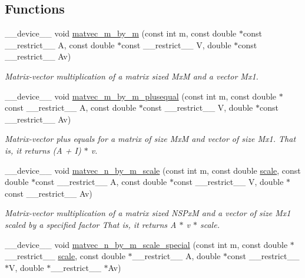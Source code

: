 \subsection*{Functions}
\begin{DoxyCompactItemize}
\item 
\+\_\+\+\_\+device\+\_\+\+\_\+ void \hyperlink{exponential__linear__algebra_8cu_a2e59348b99908b5918de88097e15d5ff}{matvec\+\_\+m\+\_\+by\+\_\+m} (const int m, const double $\ast$const \+\_\+\+\_\+restrict\+\_\+\+\_\+ A, const double $\ast$const \+\_\+\+\_\+restrict\+\_\+\+\_\+ V, double $\ast$const \+\_\+\+\_\+restrict\+\_\+\+\_\+ Av)
\begin{DoxyCompactList}\small\item\em Matrix-\/vector multiplication of a matrix sized MxM and a vector Mx1. \end{DoxyCompactList}\item 
\+\_\+\+\_\+device\+\_\+\+\_\+ void \hyperlink{exponential__linear__algebra_8cu_a6bc7e5c08b8e40b19ce05ea146c05307}{matvec\+\_\+m\+\_\+by\+\_\+m\+\_\+plusequal} (const int m, const double $\ast$const \+\_\+\+\_\+restrict\+\_\+\+\_\+ A, const double $\ast$const \+\_\+\+\_\+restrict\+\_\+\+\_\+ V, double $\ast$const \+\_\+\+\_\+restrict\+\_\+\+\_\+ Av)
\begin{DoxyCompactList}\small\item\em Matrix-\/vector plus equals for a matrix of size MxM and vector of size Mx1. That is, it returns (A + I) $\ast$ v. \end{DoxyCompactList}\item 
\+\_\+\+\_\+device\+\_\+\+\_\+ void \hyperlink{exponential__linear__algebra_8cu_a03e37312683db492dc73e08c17fe40e7}{matvec\+\_\+n\+\_\+by\+\_\+m\+\_\+scale} (const int m, const double \hyperlink{inverse_8cu_adbb4f3f3af5f968a94f717729803c88d}{scale}, const double $\ast$const \+\_\+\+\_\+restrict\+\_\+\+\_\+ A, const double $\ast$const \+\_\+\+\_\+restrict\+\_\+\+\_\+ V, double $\ast$const \+\_\+\+\_\+restrict\+\_\+\+\_\+ Av)
\begin{DoxyCompactList}\small\item\em Matrix-\/vector multiplication of a matrix sized N\+S\+PxM and a vector of size Mx1 scaled by a specified factor That is, it returns A $\ast$ v $\ast$ scale. \end{DoxyCompactList}\item 
\+\_\+\+\_\+device\+\_\+\+\_\+ void \hyperlink{exponential__linear__algebra_8cu_aafe924c72a847b1d591e8fecb0efebdc}{matvec\+\_\+n\+\_\+by\+\_\+m\+\_\+scale\+\_\+special} (const int m, const double $\ast$\+\_\+\+\_\+restrict\+\_\+\+\_\+ \hyperlink{inverse_8cu_adbb4f3f3af5f968a94f717729803c88d}{scale}, const double $\ast$\+\_\+\+\_\+restrict\+\_\+\+\_\+ A, double $\ast$const \+\_\+\+\_\+restrict\+\_\+\+\_\+ $\ast$V, double $\ast$\+\_\+\+\_\+restrict\+\_\+\+\_\+ $\ast$Av)

\end{DoxyCompactItemize}
